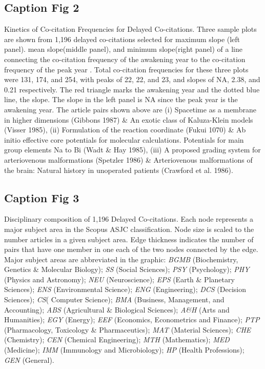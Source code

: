 \documentclass[utf8]{frontiersSCNS}
\begin{document}
\subsection{Caption Fig 2} Kinetics of Co-citation Frequencies for Delayed Co-citations. Three sample plots are shown from 1,196 delayed co-citations selected for maximum slope (left panel). mean slope(middle panel), and minimum slope(right panel) of a line connecting the co-citation frequency of the awakening year to the co-citation frequency of the peak year . Total co-citation frequencies for these three plots were 131, 174, and 254, with peaks of 22, 22, and 23, and slopes of NA, 2.38, and 0.21 respectively. The red triangle marks the awakening year and the dotted blue line, the slope. The slope in the left panel is NA since the peak year is the awakening year. The article pairs shown above are (i) Spacetime as a membrane in higher dimensions (Gibbons 1987) \& An exotic class of Kaluza-Klein models (Visser 1985), (ii) Formulation of the reaction coordinate (Fukui 1070) \& Ab initio effective core potentials for molecular calculations. Potentials for main group elements Na to Bi (Wadt \& Hay 1985), (iii) A proposed grading system for arteriovenous malformations (Spetzler 1986) \& Arteriovenous malformations of the brain: Natural history in unoperated patients (Crawford et al. 1986).

\subsection{Caption Fig 3} Disciplinary composition of 1,196 Delayed Co-citations. Each node represents a major subject area in the Scopus ASJC classification. Node size is scaled to the number articles in a given subject area. Edge thickness indicates the number of pairs that have one member in one each of the two nodes connected by the edge. Major subject areas are abbreviated in the graphic:
\emph{BGMB} (Biochemistry, Genetics \& Molecular Biology);
\emph{SS} (Social Sciences);
\emph{PSY} (Psychology);
\emph{PHY} (Physics and Astronomy);
\emph{NEU} (Neuroscience);
\emph{EPS} (Earth \& Planetary Sciences);
\emph{ENS} (Environmental Science);
\emph{ENG} (Engineering);
\emph{DCS} (Decision Sciences);
\emph{CS}( Computer Science);
\emph{BMA} (Business, Management, and Accounting);
\emph{ABS} (Agricultural \& Biological Sciences); 
\emph{A\&H} (Arts and Humanities);
\emph{EGY} (Energy);
\emph{EEF} (Economics, Econometrics and Finance);
\emph{PTP} (Pharmacology, Toxicology \& Pharmaceutics);
\emph{MAT} (Material Sciences);
\emph{CHE} (Chemistry);
\emph{CEN} (Chemical Engineering);
\emph{MTH} (Mathematics);
\emph{MED} (Medicine);
\emph{IMM} (Immunology and Microbiology);
\emph{HP} (Health Professions);
\emph{GEN} (General).
\end{document}
